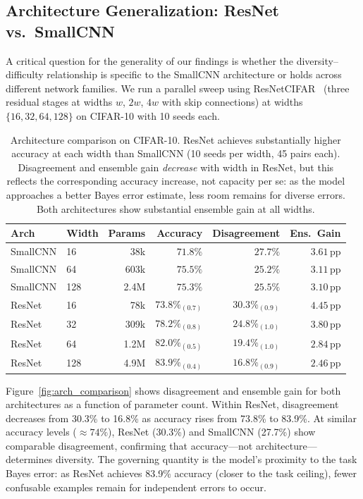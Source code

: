 \documentclass[11pt]{article}
\begin{document}
\subsection{Architecture Generalization: ResNet vs.\ SmallCNN}
\label{sec:architecture}

A critical question for the generality of our findings is whether the
diversity--difficulty relationship is specific to the SmallCNN architecture
or holds across different network families.  We run a parallel sweep using
ResNetCIFAR~\citep{he2016deep} (three residual stages at widths $w$,
$2w$, $4w$ with skip connections) at widths $\{16, 32, 64, 128\}$ on
CIFAR-10 with 10 seeds each.

\begin{table}[h]
\centering
\small
\begin{tabular}{llrrrr}
\toprule
Arch & Width & Params & Accuracy & Disagreement & Ens.\ Gain\\
\midrule
SmallCNN & 16  & 38k   & $71.8\%$ & $27.7\%$ & $3.61$\,pp\\
SmallCNN & 64  & 603k  & $75.5\%$ & $25.2\%$ & $3.11$\,pp\\
SmallCNN & 128 & 2.4M  & $75.3\%$ & $25.5\%$ & $3.10$\,pp\\
\midrule
ResNet   & 16  & 78k   & $73.8\%_{(0.7)}$ & $30.3\%_{(0.9)}$ & $4.45$\,pp\\
ResNet   & 32  & 309k  & $78.2\%_{(0.8)}$ & $24.8\%_{(1.0)}$ & $3.80$\,pp\\
ResNet   & 64  & 1.2M  & $82.0\%_{(0.5)}$ & $19.4\%_{(1.0)}$ & $2.84$\,pp\\
ResNet   & 128 & 4.9M  & $83.9\%_{(0.4)}$ & $16.8\%_{(0.9)}$ & $2.46$\,pp\\
\bottomrule
\end{tabular}
\caption{Architecture comparison on CIFAR-10.  ResNet achieves substantially
higher accuracy at each width than SmallCNN (10 seeds per width, 45 pairs each).
Disagreement and ensemble gain \emph{decrease} with width in ResNet, but this
reflects the corresponding accuracy increase, not capacity per se: as the
model approaches a better Bayes error estimate, less room remains for diverse
errors.  Both architectures show substantial ensemble gain at all widths.}
\label{tab:arch}
\end{table}

Figure~\ref{fig:arch_comparison} shows disagreement and ensemble gain for
both architectures as a function of parameter count.  Within ResNet,
disagreement decreases from 30.3\% to 16.8\% as accuracy rises from
73.8\% to 83.9\%.  At similar accuracy levels (${\approx}74\%$),
ResNet (30.3\%) and SmallCNN (27.7\%) show comparable disagreement,
confirming that accuracy---not architecture---determines diversity.
The governing quantity is the model's proximity to the task Bayes error:
as ResNet achieves 83.9\% accuracy (closer to the task ceiling), fewer
confusable examples remain for independent errors to occur.
\end{document}
